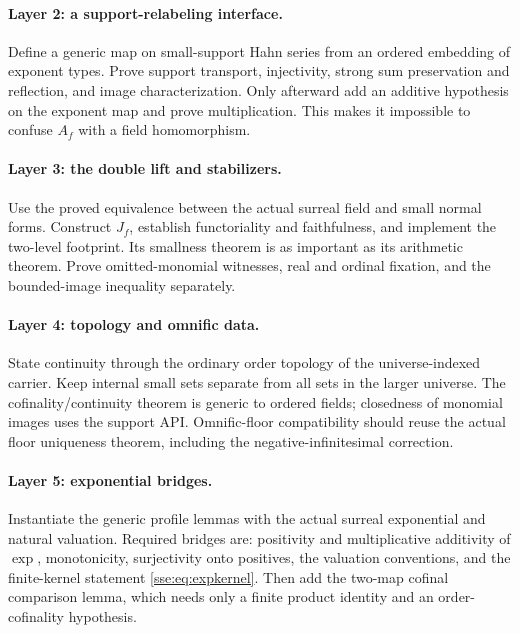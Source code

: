 \documentclass[11pt,a4paper]{article}
\numberwithin{equation}{section}
\theoremstyle{plain}
\theoremstyle{definition}
\theoremstyle{remark}
\begin{document}
\paragraph{Layer 2: a support-relabeling interface.}
Define a generic map on small-support Hahn series from an ordered embedding
of exponent types. Prove support transport, injectivity, strong sum
preservation and reflection, and image characterization. Only afterward
add an additive hypothesis on the exponent map and prove multiplication.
This makes it impossible to confuse $A_f$ with a field homomorphism.

\paragraph{Layer 3: the double lift and stabilizers.}
Use the proved equivalence between the actual surreal field and small
normal forms. Construct $J_f$, establish functoriality and faithfulness,
and implement the two-level footprint. Its smallness theorem is as
important as its arithmetic theorem. Prove omitted-monomial witnesses,
real and ordinal fixation, and the bounded-image inequality separately.

\paragraph{Layer 4: topology and omnific data.}
State continuity through the ordinary order topology of the universe-indexed
carrier. Keep internal small sets separate from all sets in the larger
universe. The cofinality/continuity theorem is generic to ordered fields;
closedness of monomial images uses the support API. Omnific-floor
compatibility should reuse the actual floor uniqueness theorem, including
the negative-infinitesimal correction.

\paragraph{Layer 5: exponential bridges.}
Instantiate the generic profile lemmas with the actual surreal exponential
and natural valuation. Required bridges are: positivity and multiplicative
additivity of $\exp$, monotonicity, surjectivity onto positives, the
valuation conventions, and the finite-kernel statement
\eqref{sse:eq:expkernel}. Then add the two-map cofinal comparison lemma, which
needs only a finite product identity and an order-cofinality hypothesis.
\end{document}
